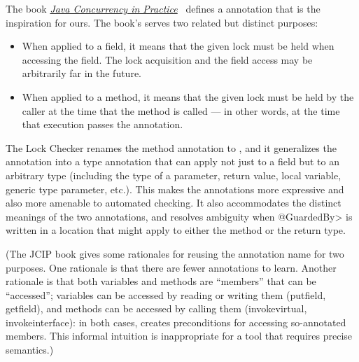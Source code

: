 The book \href{http://jcip.net/}{\emph{Java Concurrency in Practice}}~\cite{Goetz2006} defines a
\href{http://jcip.net.s3-website-us-east-1.amazonaws.com/annotations/doc/net/jcip/annotations/GuardedBy.html}{} annotation that is the inspiration for ours.  The book's
 serves two related but distinct purposes:

\begin{itemize}
\item
  When applied to a field, it means that the given lock must be held when
  accessing the field.  The lock acquisition and the field access may be
  arbitrarily far in the future.
\item
  When applied to a method, it means that the given lock must be held by
  the caller at the time that the method is called --- in other words, at
  the time that execution passes the  annotation.
\end{itemize}

The Lock Checker renames the method annotation to
, and it generalizes the
 annotation into a type annotation
that can apply not just to a field but to an arbitrary type (including the
type of a parameter, return value, local variable, generic type parameter,
etc.).  This makes the annotations more expressive and also more amenable
to automated checking.  It also accommodates the distinct
meanings of the two annotations, and resolves ambiguity when \<@GuardedBy>
is written in a location that might apply to either the method or the
return type.

(The JCIP book gives some rationales for reusing the annotation name for
two purposes.  One rationale is
that there are fewer annotations to learn.  Another rationale is
that both variables and methods are ``members'' that can be ``accessed'';
variables can be accessed by reading or writing them (putfield, getfield),
and methods can be accessed by calling them (invokevirtual,
invokeinterface):  in both cases,  creates preconditions
for accessing so-annotated members.  This informal intuition is
inappropriate for a tool that requires precise semantics.)




